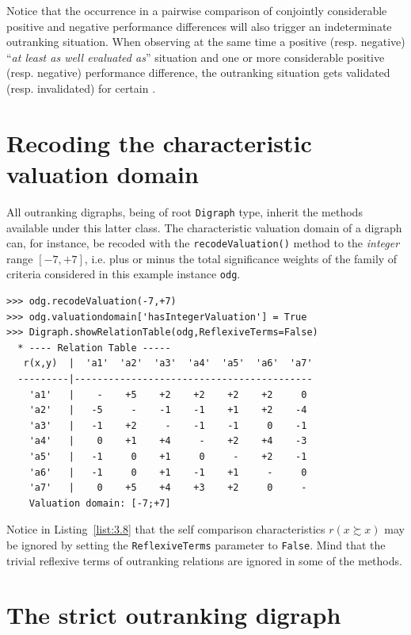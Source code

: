 Notice that the occurrence in a pairwise comparison of conjointly considerable positive and negative performance differences will also trigger an indeterminate outranking situation. When observing at the same time a positive (resp. negative) ``\emph{at least as well evaluated as}'' situation and one or more considerable positive (resp. negative) performance difference, the outranking situation gets validated (resp. invalidated) for certain \citep{BIS-2013}.

\section{Recoding the characteristic valuation domain}
\label{sec:3.4}

All outranking digraphs, being of root \texttt{Digraph} type, inherit the methods available under this latter class. The characteristic valuation domain of a digraph can, for instance, be recoded with the \texttt{recodeValuation()} method to the \emph{integer} range $[-7,+7]$, i.e. plus or minus the total significance weights of the family of criteria considered in this example instance \texttt{odg}.
\begin{lstlisting}[caption={Recoding the digraph valuation},label=list:3.8]
>>> odg.recodeValuation(-7,+7)
>>> odg.valuationdomain['hasIntegerValuation'] = True
>>> Digraph.showRelationTable(odg,ReflexiveTerms=False)
  * ---- Relation Table -----
   r(x,y)  |  'a1'  'a2'  'a3'  'a4'  'a5'  'a6'  'a7'	  
  ---------|------------------------------------------
    'a1'   |    -    +5    +2    +2    +2    +2     0	 
    'a2'   |   -5     -    -1    -1    +1    +2    -4	 
    'a3'   |   -1    +2     -    -1    -1     0    -1	 
    'a4'   |    0    +1    +4     -    +2    +4    -3	 
    'a5'   |   -1     0    +1     0     -    +2    -1	 
    'a6'   |   -1     0    +1    -1    +1     -     0	 
    'a7'   |    0    +5    +4    +3    +2     0     -	 
    Valuation domain: [-7;+7]
\end{lstlisting}

Notice in Listing~\vref{list:3.8} that the self comparison characteristics $r(x \succsim x)$ may be ignored by setting the \texttt{ReflexiveTerms} parameter to \texttt{False}. Mind that the trivial reflexive terms of outranking relations are ignored in some of the \Digraph methods. 

\section{The strict outranking digraph}
\label{sec:3.5}

